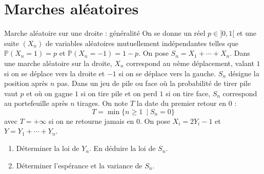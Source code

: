 \documentclass[french,a4paper]{article}
\renewcommand{\P}{\mathbb{P}}
\theoremstyle{plain}
\theoremstyle{definition}
\theoremstyle{remark}
\begin{document}
\section{Marches aléatoires}
\begin{ex}[Châteaux]{Marche aléatoire sur une droite : généralité}
	On se donne un réel $p\in]0,1[$ et une suite $(X_n)$ de variables aléatoires mutuellement indépendantes telles que $\P(X_n=1)=p$ et $\P(X_n=-1)=1-p$. On pose $S_n=X_1+\cdots+X_n$. Dans une marche aléatoire sur la droite, $X_n$ correspond au $n$ème déplacement, valant $1$ si on se déplace vers la droite et $-1$ si on se déplace vers la gauche. $S_n$ désigne la position après $n$ pas. Dans un jeu de pile ou face où la probabilité de tirer pile vaut $p$ et où on gagne $1$ si on tire pile et on perd $1$ si on tire face, $S_n$ correspond au portefeuille après $n$ tirages. On note $T$ la date du premier retour en $0$ : $$T=\min\{n\geqslant 1\ \mid S_n=0\}$$ avec $T=+\infty$ si on ne retourne jamais en $0$. On pose $X_i=2Y_i-1$ et $Y=Y_1+\cdots+Y_n$.
	\begin{enumerate}
		\item Déterminer la loi de $Y_n$. En déduire la loi de $S_n$. 
		\item Déterminer l'espérance et la variance de $S_n$.
	\end{enumerate}
\end{ex}
\end{document}
